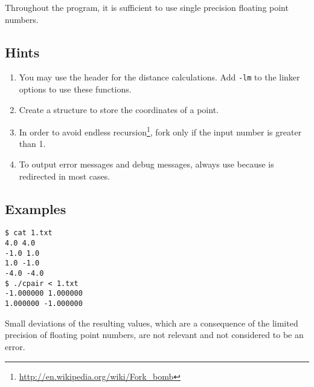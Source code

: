 Throughout the program,
it is sufficient to use single precision floating point numbers.

\clearpage
\subsection*{Hints}
\begin{enumerate}
\item You may use the header  for the distance calculations.
Add \verb|-lm| to the linker options to use these functions.
\item Create a structure to store the coordinates of a point.
\item In order to avoid endless recursion\footnote{\url{http://en.wikipedia.org/wiki/Fork\_bomb}},
fork only if the input number is greater than 1.
\item To output error messages and debug messages, always use
 because  is redirected in most cases.
\end{enumerate}

\subsection*{Examples}
\begin{verbatim}
$ cat 1.txt
4.0 4.0
-1.0 1.0
1.0 -1.0
-4.0 -4.0
$ ./cpair < 1.txt
-1.000000 1.000000
1.000000 -1.000000
\end{verbatim}

Small deviations of the resulting values,
which are a consequence of the limited precision of floating point numbers,
are not relevant and not considered to be an error.



\osueguidelinestwo


